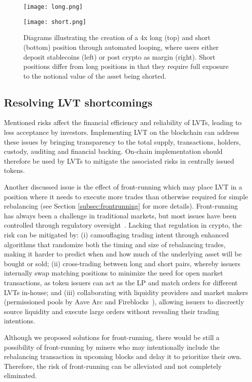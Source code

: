 \begin{figure}[p]
	\centering
	\texttt{[image: long.png]}
	\caption[Long vs. Short Position Creation]{Diagrams illustrating the creation of a 4x long (top) and short (bottom) position through automated looping, where users either deposit stablecoins (left) or post crypto as margin (right). Short positions differ from long positions in that they require full exposure to the notional value of the asset being shorted.}
	\centering
	\texttt{[image: short.png]}
	\label{fig:looping}
\end{figure}

\subsection{Resolving LVT shortcomings}\label{subsec:resolve}
Mentioned risks affect the financial efficiency and reliability of LVTs, leading to less acceptance by investors. Implementing LVT on the blockchain can address these issues by bringing transparency to the total supply, transactions, holders, custody, auditing and financial backing. On-chain implementation should therefore be used by LVTs to mitigate the associated risks in centrally issued tokens.

Another discussed issue is the effect of front-running which may place LVT in a position where it needs to execute more trades than otherwise required for simple rebalancing (see Section \ref{subsec:frontrunning} for more details). Front-running has always been a challenge in traditional markets, but most issues have been controlled through regulatory oversight~\cite{SEC_Oversight}. Lacking that regulation in crypto, the risk can be mitigated by: (i) camouflaging trading intent through enhanced algorithms that randomize both the timing and size of rebalancing trades, making it harder to predict when and how much of the underlying asset will be bought or sold; (ii) cross-trading between long and short pairs, whereby issuers internally swap matching positions to minimize the need for open market transactions, as token issuers can act as the LP and match orders for different LVTs in-house; and (iii) collaborating with liquidity providers and market makers (\eg permissioned pools by Aave Arc and Fireblocks~\cite{Aave_Arc}), allowing issuers to discreetly source liquidity and execute large orders without revealing their trading intentions.

Although we proposed solutions for front-running, there would be still a possibility of front-running by miners who may intentionally include the rebalancing transaction in upcoming blocks and delay it to prioritize their own. Therefore, the risk of front-running can be alleviated and not completely eliminated.

